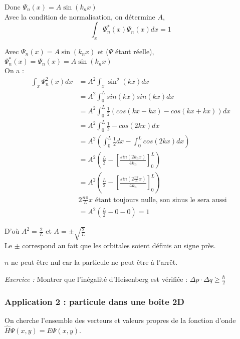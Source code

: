 \documentclass[../main.tex]{subfile}
\begin{document}
      Donc $\Psi_n(x) = A\sin(k_n x)$\\

      Avec la condition de normalisation, on détermine $A$, \\
      $$\int_x \Psi_n^*(x) \Psi_n(x) dx = 1$$

      Avec $\Psi_n(x) = A \sin(k_n x)$ et ($\Psi$ étant réelle), $\Psi_n^*(x) = \Psi_n(x) = A \sin(k_n x)$\\
      On a :
      $$
\begin{aligned}
   \int_x \Psi_n^2(x)dx &= A^2 \int_x \sin^2(kx)dx\\
   &= A^2 \int_0^L sin(kx) sin(kx) dx\\
   &= A^2 \int_0^L \frac{1}{2} (cos(kx - kx) - cos(kx + kx)) dx\\
   &= A^2 \int_0^L \frac{1}{2} - cos(2kx) dx\\
   &= A^2 (\int_0^L \frac{1}{2}dx - \int_0^L cos(2kx) dx)\\
   &= A^2 (\frac{L}{2} - [\frac{sin(2k_nx)}{4k_n}]_0^L)\\
   &= A^2 (\frac{L}{2} - [\frac{sin(2\frac{n\pi}{L}x)}{4k_n}]_0^L)\\
   & 2\frac{n\pi}{L}x \text{ étant toujours nulle, son sinus le sera aussi}\\
   &= A^2(\frac{L}{2} - 0 - 0) = 1
\end{aligned}
      $$

      D'où $A^2 = \frac{2}{L}$ et $A = \pm \sqrt{\frac{2}{L}}$\\
      Le $\pm$ correspond au fait que les orbitales soient définis au signe près.\\

     \begin{rema} 
         $n$ ne peut être nul car la particule ne peut être à l'arrêt.
     \end{rema}

     \emph{Exercice :} Montrer que l'inégalité d'Heisenberg est vérifiée : $\Delta p \cdot \Delta q \geq \frac{\hbar}{2}$


     \subsubsection{Application 2 : particule dans une boîte 2D}

     On cherche l'ensemble des vecteurs et valeurs propres de la fonction d'onde $\hat{H} \Psi(x, y) = E \Psi(x, y)$.\\
\end{document}
